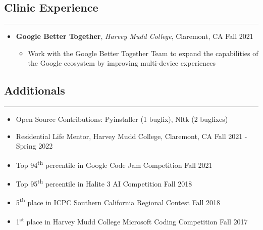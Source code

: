 \documentclass[10pt,letterpaper]{article}
\begin{document}
\subsection*{Clinic Experience}
\vspace{-0.5em}
\hrule
\vspace{1em}
  \begin{itemize}[label={},leftmargin=*]
    \setlength\itemsep{1em}
    \parskip=-0.2em
    \item
    {\textbf{Google Better Together}, \textit{Harvey Mudd College}, Claremont, CA \hfill {Fall 2021}}
    \begin{itemize}[label=\textbullet]
      \itemsep0em
        \item  Work with the Google Better Together Team to expand the capabilities of the Google ecosystem by improving multi-device experiences
    \end{itemize}
  \end{itemize}


\subsection*{Additionals}
\vspace{-0.2em}
\hrule
\vspace{1em}
  \begin{itemize}[label={},leftmargin=*]
    \setlength\itemsep{0.3em}
    \parskip=-0.2em
    \item
    Open Source Contributions: Pyinstaller (1 bugfix), Nltk (2 bugfixes)
    \item
    Residential Life Mentor, Harvey Mudd College, Claremont, CA \hfill Fall 2021 - Spring 2022
    \item
    Top 94\textsuperscript{th} percentile in Google Code Jam Competition \hfill Fall 2021
    \item
    Top 95\textsuperscript{th} percentile in Halite 3 AI Competition \hfill Fall 2018
    \item
    5\textsuperscript{th} place in ICPC Southern California Regional Contest \hfill Fall 2018
    \item
    1\textsuperscript{st} place in Harvey Mudd College Microsoft Coding Competition \hfill
    Fall 2017
  \end{itemize}
\end{document}
